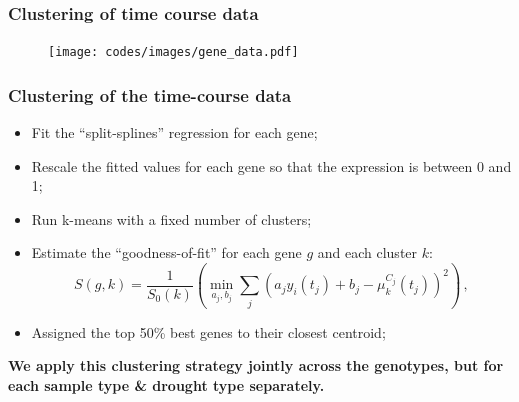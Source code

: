 \documentclass[xcolor=dvipsnames]{beamer}
\begin{document}
\begin{frame}
\frametitle{Clustering of time course data}
\begin{figure}
\texttt{[image: codes/images/gene\_data.pdf]}
\end{figure}
\end{frame}

\begin{frame}
\frametitle{Clustering of the time-course data}

\begin{itemize}[label={$\bullet$}]
\item Fit the ``split-splines'' regression for each gene;
\item Rescale the fitted values for each gene so that the expression is between 0 and 1;
\item Run k-means with a fixed number of clusters;
\item Estimate the ``goodness-of-fit'' for each gene $g$ and each cluster $k$:
{\footnotesize
\begin{equation}
S(g, k) =  \frac{1}{S_0(k)} \left(\underset{a_j, b_j}{\min}\sum_{j}
{\left(a_j y_i(t_j)
+ b_j - \mu^{C_j}_k(t_j)\right)}^2 \right)\,,
\end{equation}}
\item Assigned the top 50\% best genes to their closest centroid;
\end{itemize}

{\bf We apply this clustering strategy jointly across the genotypes, but for
each sample type \& drought type separately.}
\end{frame}
\end{document}
